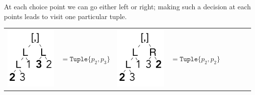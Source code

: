 \documentclass[a4paper,english]{lipics-v2019}
\newcommand{\xt}[1]{\texttt{#1}}
\newcommand{\tuple}[1]{\xt{Tuple\{}#1\xt{\}}}
\begin{document}
\noindent
At each choice point we can go either left or right; making such a decision
at each points leads to visit one particular tuple.

\medskip
{\small
\begin{tabular}{@{}l@{~}ll@{~}ll@{~}ll@{~}l}
\begin{minipage}{1.2cm}\includegraphics[scale=.25]{figures/tree2.pdf} 
\end{minipage} &  $ =   \tuple{p_2,p_3} $ &
\begin{minipage}{1.2cm}\includegraphics[scale=.25]{figures/tree3.pdf} 
\end{minipage} &  $ =   \tuple{p_2,p_2} $ 

\end{tabular}}
\end{document}
